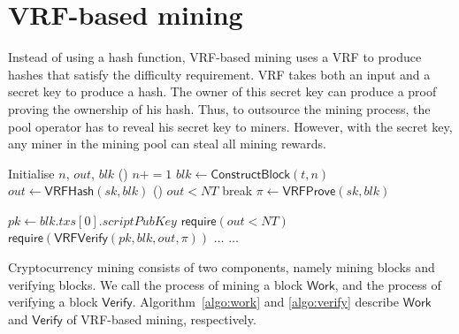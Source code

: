 \section{VRF-based mining}
\label{sec:construction}

Instead of using a hash function, VRF-based mining uses a VRF to produce hashes that satisfy the difficulty requirement.
VRF takes both an input and a secret key to produce a hash.
The owner of this secret key can produce a proof proving the ownership of his hash.
Thus, to outsource the mining process, the pool operator has to reveal his secret key to miners.
However, with the secret key, any miner in the mining pool can steal all mining rewards.

\begin{algorithm}[]
\caption{$\mathsf{Work}(sk, t, NT)$.}\label{algo:work}
\SetAlgoLined\DontPrintSemicolon
{}
  Initialise $n$, $out$, $blk$ 
  \While () {$n += 1$}{
    $blk \gets \mathsf{ConstructBlock}(t, n)$ 
    $out \gets \mathsf{VRFHash}(sk, blk)$ 
    \If () {$out < NT$}{
      break 
    }
  }
  $\pi \gets \mathsf{VRFProve}(sk, blk)$ 
   
\end{algorithm}



\begin{algorithm}[h]
\caption{$\mathsf{Verify}(blk, out, \pi, NT)$}\label{algo:verify}
\SetAlgoLined\DontPrintSemicolon
$pk \gets blk . txs[0] . scriptPubKey$ 
$\mathsf{require}(out < NT)$ 
$\mathsf{require}(\mathsf{VRFVerify}(pk, blk, out, \pi))$ \;
$\dots$ 
$\dots$ 
\end{algorithm}

Cryptocurrency mining consists of two components, namely mining blocks and verifying blocks.
We call the process of mining a block $\mathsf{Work}$, and the process of verifying a block $\mathsf{Verify}$.
Algorithm~\ref{algo:work} and \ref{algo:verify} describe $\mathsf{Work}$ and $\mathsf{Verify}$ of VRF-based mining, respectively.

